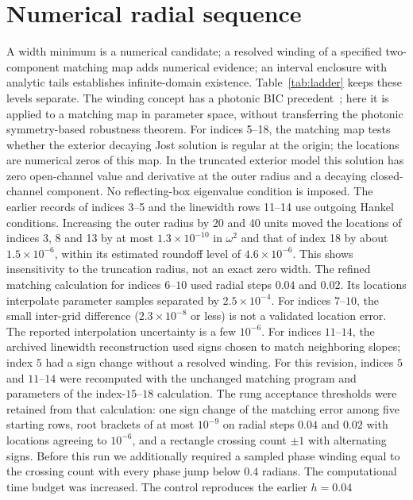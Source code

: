 \section{Numerical radial sequence}\label{sec:sequence}
A width minimum is a numerical candidate; a resolved winding of a
specified two-component matching map adds numerical evidence; an
interval enclosure with analytic tails establishes infinite-domain
existence. Table~\ref{tab:ladder} keeps these levels separate.
The winding concept has a photonic BIC precedent~\cite{Zhen2014}; here
it is applied to a matching map in parameter space, without transferring
the photonic symmetry-based robustness theorem.
For indices 5--18, the matching map tests whether the exterior decaying
Jost solution is regular at the origin; the locations are numerical
zeros of this map. In the truncated exterior model this solution has
zero open-channel value and derivative at the outer radius and a
decaying closed-channel component. No reflecting-box eigenvalue
condition is imposed. The earlier records of indices 3--5 and the
linewidth rows 11--14 use outgoing Hankel conditions.
Increasing the outer radius by 20 and 40 units moved the locations of
indices 3, 8 and 13 by at most $1.3\times10^{-10}$ in $\omega^2$ and that
of index 18 by about $1.5\times10^{-6}$, within its estimated roundoff
level of $4.6\times10^{-6}$. This shows insensitivity to the truncation
radius, not an exact zero width.
The refined matching calculation for indices $6$--$10$ used radial
steps $0.04$ and $0.02$. Its locations interpolate parameter samples
separated by $2.5\times10^{-4}$. For indices $7$--$10$, the small
inter-grid difference ($2.3\times10^{-8}$ or less) is not a validated location error.
The reported interpolation uncertainty is a few $10^{-6}$.
For indices $11$--$14$, the archived linewidth reconstruction used signs
chosen to match neighboring slopes; index $5$ had a sign change without
a resolved winding. For this revision, indices $5$ and $11$--$14$ were
recomputed with the unchanged matching program and parameters of the
index-$15$--$18$ calculation. The rung acceptance thresholds were
retained from that calculation: one sign change of the matching error
among five starting rows, root brackets of at most $10^{-9}$ on radial
steps $0.04$ and $0.02$ with locations agreeing to $10^{-6}$, and a
rectangle crossing count $\pm1$ with alternating signs. Before this run
we additionally required a sampled phase winding equal to the crossing
count with every phase jump below $0.4$ radians. The computational time
budget was increased. The control reproduces the earlier $h=0.04$
